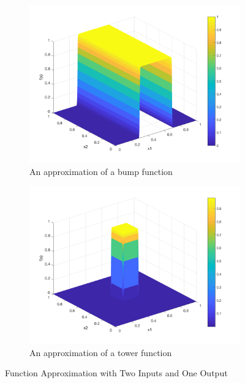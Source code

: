 \documentclass{article}
\begin{document}
\begin{figure}[h!]
\centering
\begin{subfigure}{.49\textwidth}
  \centering
  \includegraphics[width=.99\linewidth]{2d_bump.png}
  \caption{An approximation of a bump function}
  \label{fig:2d_bump}
\end{subfigure}
\begin{subfigure}{.49\textwidth}
  \centering
  \includegraphics[width=.99\linewidth]{2d_peak.png}
  \caption{An approximation of a tower function}
  \label{fig:2d_peak}
\end{subfigure}%
\caption{Function Approximation with Two Inputs and One Output}
\label{fig:bump_appro}
\end{figure}
\end{document}
